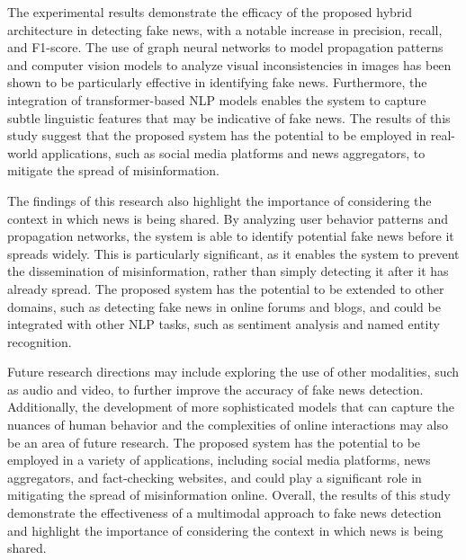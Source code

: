 \documentclass[conference]{IEEEtran}
\begin{document}
The experimental results demonstrate the efficacy of the proposed hybrid architecture in detecting fake news, with a notable increase in precision, recall, and F1-score. The use of graph neural networks to model propagation patterns and computer vision models to analyze visual inconsistencies in images has been shown to be particularly effective in identifying fake news. Furthermore, the integration of transformer-based NLP models enables the system to capture subtle linguistic features that may be indicative of fake news. The results of this study suggest that the proposed system has the potential to be employed in real-world applications, such as social media platforms and news aggregators, to mitigate the spread of misinformation.

The findings of this research also highlight the importance of considering the context in which news is being shared. By analyzing user behavior patterns and propagation networks, the system is able to identify potential fake news before it spreads widely. This is particularly significant, as it enables the system to prevent the dissemination of misinformation, rather than simply detecting it after it has already spread. The proposed system has the potential to be extended to other domains, such as detecting fake news in online forums and blogs, and could be integrated with other NLP tasks, such as sentiment analysis and named entity recognition.

Future research directions may include exploring the use of other modalities, such as audio and video, to further improve the accuracy of fake news detection. Additionally, the development of more sophisticated models that can capture the nuances of human behavior and the complexities of online interactions may also be an area of future research. The proposed system has the potential to be employed in a variety of applications, including social media platforms, news aggregators, and fact-checking websites, and could play a significant role in mitigating the spread of misinformation online. Overall, the results of this study demonstrate the effectiveness of a multimodal approach to fake news detection and highlight the importance of considering the context in which news is being shared.
\end{document}
